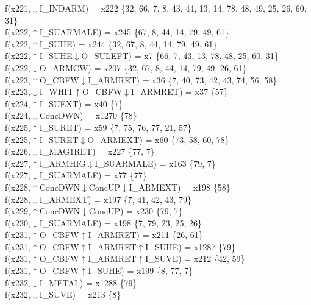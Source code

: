 f(x221,$\downarrow$I\_INDARM) = x222 \{32, 66, 7, 8, 43, 44, 13, 14, 78, 48, 49, 25, 26, 60, 31\} \\  
f(x222,$\uparrow$I\_SUARMALE) = x245 \{67, 8, 44, 14, 79, 49, 61\} \\  
f(x222,$\uparrow$I\_SUHE) = x244 \{32, 67, 8, 44, 14, 79, 49, 61\} \\  
f(x222,$\uparrow$I\_SUHE$\downarrow$O\_SULEFT) = x7 \{66, 7, 43, 13, 78, 48, 25, 60, 31\} \\  
f(x222,$\downarrow$O\_ARMCW) = x207 \{32, 67, 8, 44, 14, 79, 49, 26, 61\} \\  
f(x223,$\uparrow$O\_CBFW$\downarrow$I\_ARMRET) = x36 \{7, 40, 73, 42, 43, 74, 56, 58\} \\  
f(x223,$\downarrow$I\_WHIT$\uparrow$O\_CBFW$\downarrow$I\_ARMRET) = x37 \{57\} \\  
f(x224,$\uparrow$I\_SUEXT) = x40 \{7\} \\  
f(x224,$\downarrow$ConcDWN) = x1270 \{78\} \\  
f(x225,$\uparrow$I\_SURET) = x59 \{7, 75, 76, 77, 21, 57\} \\  
f(x225,$\uparrow$I\_SURET$\downarrow$O\_ARMEXT) = x60 \{73, 58, 60, 78\} \\  
f(x226,$\downarrow$I\_MAG1RET) = x227 \{77, 7\} \\  
f(x227,$\uparrow$I\_ARMHIG$\downarrow$I\_SUARMALE) = x163 \{79, 7\} \\  
f(x227,$\downarrow$I\_SUARMALE) = x77 \{77\} \\  
f(x228,$\uparrow$ConcDWN$\downarrow$ConcUP$\downarrow$I\_ARMEXT) = x198 \{58\} \\  
f(x228,$\downarrow$I\_ARMEXT) = x197 \{7, 41, 42, 43, 79\} \\  
f(x229,$\uparrow$ConcDWN$\downarrow$ConcUP) = x230 \{79, 7\} \\  
f(x230,$\downarrow$I\_SUARMALE) = x198 \{7, 79, 23, 25, 26\} \\  
f(x231,$\uparrow$O\_CBFW$\uparrow$I\_ARMRET) = x211 \{26, 61\} \\  
f(x231,$\uparrow$O\_CBFW$\uparrow$I\_ARMRET$\uparrow$I\_SUHE) = x1287 \{79\} \\  
f(x231,$\uparrow$O\_CBFW$\uparrow$I\_ARMRET$\uparrow$I\_SUVE) = x212 \{42, 59\} \\  
f(x231,$\uparrow$O\_CBFW$\uparrow$I\_SUHE) = x199 \{8, 77, 7\} \\  
f(x232,$\downarrow$I\_METAL) = x1288 \{79\} \\  
f(x232,$\downarrow$I\_SUVE) = x213 \{8\} \\  
